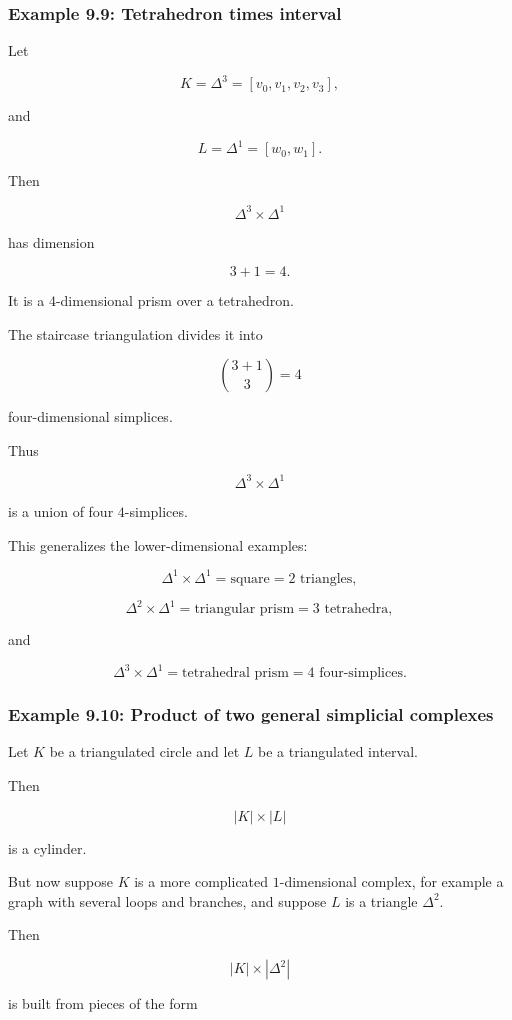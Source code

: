 \documentclass[12pt,a4paper]{article}
\theoremstyle{notespace}
\begin{document}
\subsubsection{Example 9.9: Tetrahedron times interval}

Let

\[
K=\Delta^3=[v_0,v_1,v_2,v_3],
\]

and

\[
L=\Delta^1=[w_0,w_1].
\]

Then

\[
\Delta^3\times \Delta^1
\]

has dimension

\[
3+1=4.
\]

It is a \(4\)-dimensional prism over a tetrahedron.

The staircase triangulation divides it into

\[
\binom{3+1}{3}=4
\]

four-dimensional simplices.

Thus

\[
\Delta^3\times \Delta^1
\]

is a union of four \(4\)-simplices.

This generalizes the lower-dimensional examples:

\[
\Delta^1\times \Delta^1
=
\text{square}
=
2\text{ triangles},
\]

\[
\Delta^2\times \Delta^1
=
\text{triangular prism}
=
3\text{ tetrahedra},
\]

and

\[
\Delta^3\times \Delta^1
=
\text{tetrahedral prism}
=
4\text{ four-simplices}.
\]

\subsubsection{Example 9.10: Product of two general simplicial complexes}

Let \(K\) be a triangulated circle and let \(L\) be a triangulated interval.

Then

\[
|K|\times |L|
\]

is a cylinder.

But now suppose \(K\) is a more complicated \(1\)-dimensional complex, for example a graph with several loops and branches, and suppose \(L\) is a triangle \(\Delta^2\).

Then

\[
|K|\times |\Delta^2|
\]

is built from pieces of the form
\end{document}
